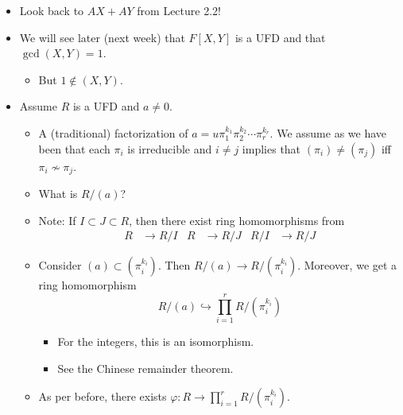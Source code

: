 \documentclass[../notes.tex]{subfiles}
\begin{document}
\begin{itemize}
\begin{proof}
        Since $R$ is a PID, there exists $d\in R$ such that $Ra+Rb=Rd$. Any such $d$ is a generator of $Ra+Rb$. To prove that $d=\gcd(a,b)$, it will suffice to show that $d\mid a$, $d\mid b$, and $d'\mid a,b$ implies $d'\mid d$. Let's begin.\par
        Since $Ra,Rb\subset Ra+Rb=Rd$, we know that $a,b\in(d)$. Thus, $d\mid a,b$. Now let $d'\in R$ be an arbitrary element such that $d'\mid a$ and $d'\mid b$. It follows that $a,b\in(d')$. Since $d\in Ra+Rb$, there exist $\alpha,\beta\in R$ such that $\alpha a+\beta b=d$. Thus, $d=\alpha a+\beta b\in(d')$, so $d'\mid d$, as desired.
    \end{proof}
    \item Look back to $AX+AY$ from Lecture 2.2!
    \item We will see later (next week) that $F[X,Y]$ is a UFD and that $\gcd(X,Y)=1$.
    \begin{itemize}
        \item But $1\notin(X,Y)$.
    \end{itemize}
    \item Assume $R$ is a UFD and $a\neq 0$.
    \begin{itemize}
        \item A (traditional) factorization of $a=u\pi_1^{k_1}\pi_2^{k_2}\cdots\pi_r^{k_r}$. We assume as we have been that each $\pi_i$ is irreducible and $i\neq j$ implies that $(\pi_i)\neq(\pi_j)$ iff $\pi_i\nsim\pi_j$.
        \item What is $R/(a)$?
        \item Note: If $I\subset J\subset R$, then there exist ring homomorphisms from
        \begin{align*}
            R &\to R/I&
            R &\to R/J&
            R/I &\to R/J
        \end{align*}
        \item Consider $(a)\subset(\pi_i^{k_i})$. Then $R/(a)\to R/(\pi_i^{k_i})$. Moreover, we get a ring homomorphism
        \begin{equation*}
            R/(a) \hookrightarrow \prod_{i=1}^rR/(\pi_i^{k_i})
        \end{equation*}
        \begin{itemize}
            \item For the integers, this is an isomorphism.
            \item See the Chinese remainder theorem.
        \end{itemize}
        \item As per before, there exists $\varphi:R\to\prod_{i=1}^rR/(\pi_i^{k_i})$.

\end{itemize}
\end{itemize}
\end{document}
